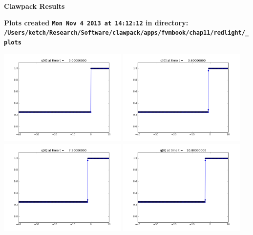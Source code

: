 \documentclass[11pt]{article}
\begin{document}
        \begin{center}{\Large\bf Clawpack Results}\vskip 5pt
        
        \bf Plots created {\tt Mon Nov  4 2013 at 14:12:12} in directory: \vskip 5pt
        \verb+/Users/ketch/Research/Software/clawpack/apps/fvmbook/chap11/redlight/_plots+
        \end{center}
        \vskip 5pt
        \includegraphics[width=0.475\textwidth]{frame0000fig1.png}
\vskip 10pt 
\includegraphics[width=0.475\textwidth]{frame0001fig1.png}
\vskip 10pt 
\includegraphics[width=0.475\textwidth]{frame0002fig1.png}
\vskip 10pt 
\includegraphics[width=0.475\textwidth]{frame0003fig1.png}
\end{document}
